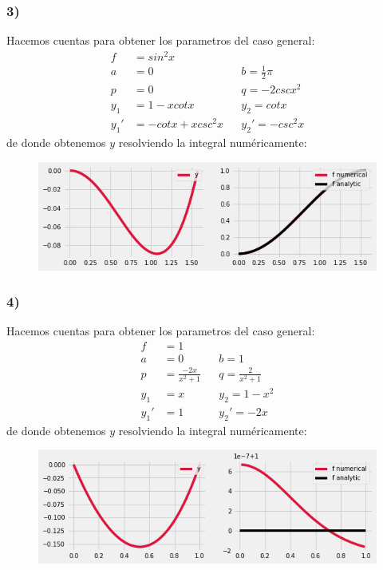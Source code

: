 \documentclass{article}
\begin{document}
\begin{tcolorbox}[breakable]
    \subsubsection*{3)}
    Hacemos cuentas para obtener los parametros del caso general:
    \begin{align*}
        f&= sin^2x \\
        a&=0 &&b=\frac{1}{2}\pi \\
        p&=0 &&q= -2cscx^2 \\
        y_1 &= 1-xcotx  &&y_2= cotx \\
        y_1' &= -cotx + xcsc^2x  &&y_2'= -csc^2x 
    \end{align*}
    de donde obtenemos $y$ resolviendo la integral numéricamente:
    \begin{figure}[H]
        \centering
        \includegraphics[scale=0.7]{images/p3_3.png}
    \end{figure}

    \subsubsection*{4)}
    Hacemos cuentas para obtener los parametros del caso general:
    \begin{align*}
        f&= 1 \\
        a &=0 &&b=1 \\
        p &=\frac{-2x}{x^2+1} &&q= \frac{2}{x^2+1} \\
        y_1 &=x  &&y_2= 1-x^2 \\
        y_1' &=1 &&y_2'= -2x  
    \end{align*}
    de donde obtenemos $y$ resolviendo la integral numéricamente:
    \begin{figure}[H]
        \centering
        \includegraphics[scale=0.7]{images/p3_4.png}
    \end{figure}
\end{tcolorbox}
\newpage
\end{document}
